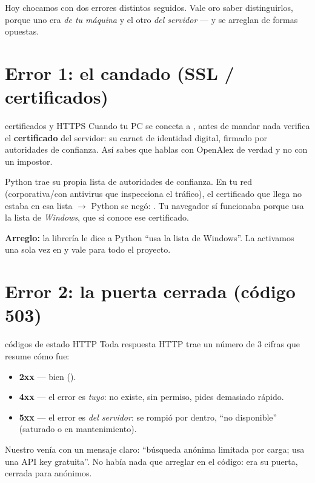 \documentclass[11pt,a4paper]{article}
\begin{document}

Hoy chocamos con dos errores distintos seguidos. Vale oro saber distinguirlos, porque uno
era \emph{de tu máquina} y el otro \emph{del servidor} — y se arreglan de formas opuestas.

\section{Error 1: el candado (SSL / certificados)}

\begin{concepto}{certificados y HTTPS}
Cuando tu PC se conecta a , antes de mandar nada verifica
el \textbf{certificado} del servidor: su carnet de identidad digital, firmado por
autoridades de confianza. Así sabes que hablas con OpenAlex de verdad y no con un impostor.

Python trae su propia lista de autoridades de confianza. En tu red (corporativa/con
antivirus que inspecciona el tráfico), el certificado que llega no estaba en esa lista
$\rightarrow$ Python se negó: . Tu navegador sí
funcionaba porque usa la lista de \emph{Windows}, que sí conoce ese certificado.

\textbf{Arreglo:} la librería  le dice a Python ``usa la lista de
Windows''. La activamos una sola vez en  y vale para todo
el proyecto.
\end{concepto}

\section{Error 2: la puerta cerrada (código 503)}

\begin{concepto}{códigos de estado HTTP}
Toda respuesta HTTP trae un número de 3 cifras que resume cómo fue:
\begin{itemize}
  \item \textbf{2xx} --- bien ().
  \item \textbf{4xx} --- el error es \emph{tuyo}:  no existe,  sin permiso,
         pides demasiado rápido.
  \item \textbf{5xx} --- el error es \emph{del servidor}:  se rompió por dentro,
         ``no disponible'' (saturado o en mantenimiento).
\end{itemize}
Nuestro  venía con un mensaje claro: ``búsqueda anónima limitada por carga;
usa una API key gratuita''. No había nada que arreglar en el código: era su puerta, cerrada
para anónimos.
\end{concepto}
\end{document}
